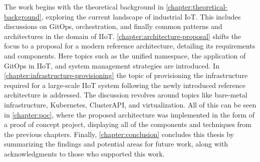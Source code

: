 The work begins with the theoretical background in \autoref{chapter:theoretical-background}, exploring the current landscape of industrial IoT. This includes discussions on GitOps, orchestration, and finally common patterns and architectures in the domain of IIoT. \autoref{chapter:architecture-proposal} shifts the focus to a proposal for a modern reference architecture, detailing its requirements and components. Here topics such as the unified namespace, the application of GitOps in IIoT, and system management strategies are introduced. In \autoref{chapter:infrastructure-provisioning} the topic of provisioning the infrastructure required for a large-scale IIoT system following the newly introduced reference architecture is addressed. The discussion revolves around topics like bare-metal infrastructure, Kubernetes, ClusterAPI, and virtualization. All of this can be seen in \autoref{chapter:poc}, where the proposed architecture was implemented in the form of a proof of concept project, displaying all of the components and techniques from the previous chapters. Finally, \autoref{chapter:conclusion} concludes this thesis by summarizing the findings and potential areas for future work, along with acknowledgments to those who supported this work.




